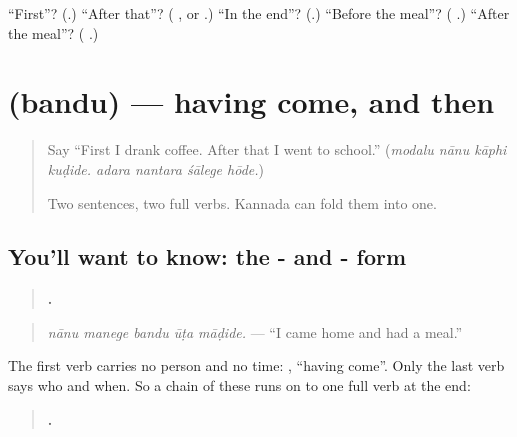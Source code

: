 \begin{tcolorbox}[breakable,colback=teal!4,colframe=teal!35!black,title={Before you move on}]
\textquotedblleft{}First\textquotedblright{}? (\textbf{}.) \textquotedblleft{}After that\textquotedblright{}? (\textbf{ }, or \textbf{}.) \textquotedblleft{}In the end\textquotedblright{}? (\textbf{}.) \textquotedblleft{}Before the meal\textquotedblright{}? (\textbf{ }.) \textquotedblleft{}After the meal\textquotedblright{}? (\textbf{ }.)
\end{tcolorbox}
\section[\texorpdfstring{\kn{ಬಂದು} (bandu)}{ಬಂದು (bandu)}]{ (bandu) — having come, and then}

\label{lesson:KA-C310-bandu}



\begin{quote}
Say \textquotedblleft{}First I drank coffee. After that I went to school.\textquotedblright{} (\emph{modalu nānu kāphi kuḍide. adara nantara śālege hōde.})

Two sentences, two full verbs. Kannada can fold them into one.
\end{quote}

\subsection*{You'll want to know: the - and - form}
\begin{quote}
\textbf{    .}
\end{quote}

\begin{quote}
\emph{nānu manege bandu ūṭa māḍide.} — \textquotedblleft{}I came home and had a meal.\textquotedblright{}
\end{quote}

The first verb carries no person and no time: \textbf{}, \textquotedblleft{}having come\textquotedblright{}. Only the last verb says who and when. So a chain of these runs on to one full verb at the end:

\begin{quote}
\textbf{       .}
\end{quote}

